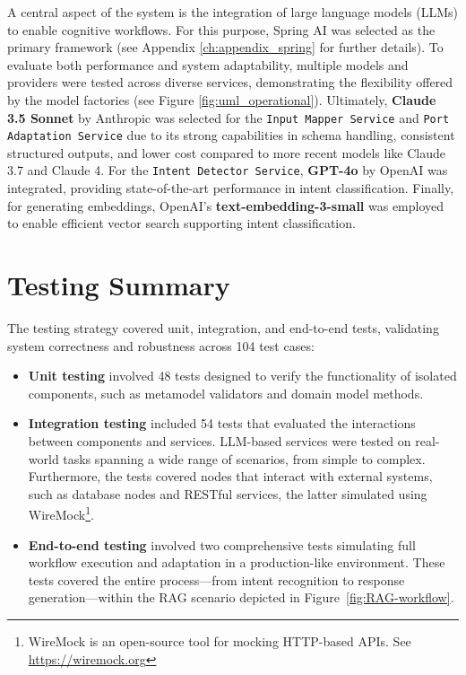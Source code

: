 A central aspect of the system is the integration of large language models (LLMs) to enable cognitive workflows. For this purpose, Spring AI was selected as the primary framework (see Appendix \ref{ch:appendix_spring} for further details).
To evaluate both performance and system adaptability, multiple models and providers were tested across diverse services, demonstrating the flexibility offered by the model factories (see Figure \ref{fig:uml_operational}). Ultimately, \textbf{Claude 3.5 Sonnet} by Anthropic was selected for the \texttt{Input Mapper Service} and \texttt{Port Adaptation Service} due to its strong capabilities in schema handling, consistent structured outputs, and lower cost compared to more recent models like Claude 3.7 and Claude 4. For the \texttt{Intent Detector Service}, \textbf{GPT-4o} by OpenAI was integrated, providing state-of-the-art performance in intent classification. Finally, for generating embeddings, OpenAI’s \textbf{text-embedding-3-small} was employed to enable efficient vector search supporting intent classification.


\section*{Testing Summary}


The testing strategy covered unit, integration, and end-to-end tests, validating system correctness and robustness across 104 test cases:


\begin{itemize}[leftmargin=*, label=--]
    \item \textbf{Unit testing} involved 48 tests designed to verify the functionality of isolated components, such as metamodel validators and domain model methods.
    
    \item \textbf{Integration testing} included 54 tests that evaluated the interactions between components and services. LLM-based services were tested on real-world tasks spanning a wide range of scenarios, from simple to complex. Furthermore, the tests covered nodes that interact with external systems, such as database nodes and RESTful services, the latter simulated using WireMock\footnote{WireMock is an open-source tool for mocking HTTP-based APIs. See \url{https://wiremock.org}}.
    
    \item \textbf{End-to-end testing} involved two comprehensive tests simulating full workflow execution and adaptation in a production-like environment. These tests covered the entire process—from intent recognition to response generation—within the RAG scenario depicted in Figure~\ref{fig:RAG-workflow}.
\end{itemize}


